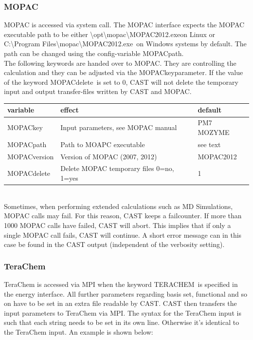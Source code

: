 \documentclass[10pt,a4paper]{article} %
\newif\ifverbose %
\begin{document}
		\subsubsection{MOPAC}
		\ac{MOPAC} is accessed via system call. The \ac{MOPAC} interface expects the \ac{MOPAC} executable path to be either \glqq \textbackslash opt\textbackslash mopac\textbackslash MOPAC2012.exe\grqq on Linux \ifverbose (yes, the executable default fileending is .exe even on Linux-Systems) \fi or \glqq C:\textbackslash Program Files\textbackslash mopac\textbackslash MOPAC2012.exe\grqq~on Windows systems by default. The path can be changed using the config-variable \glqq MOPACpath\grqq.~\\
		The following keywords are handed over to \ac{MOPAC}. They are controlling the calculation and they can be adjusted via the \glqq MOPACkey\grqq parameter.
		If the value of the keyword \glqq MOPACdelete\grqq \ is set to 0, \ac{CAST} will not delete the temporary input and output transfer-files written by \ac{CAST} and \ac{MOPAC}.

		\begin{tabularx}{\textwidth}{l|l|l}
			variable & effect & default \\
			\hline
			MOPACkey & Input parameters, see MOPAC manual & PM7 MOZYME\\
			MOPACpath & Path to MOAPC executable & see text\\
			MOPACversion & Version of MOPAC (2007, 2012) & MOPAC2012\\
			MOPACdelete & Delete MOPAC temporary files 0=no, 1=yes & 1\\

		\end{tabularx}~\\
		
		Sometimes, when performing extended calculations such as \ac{MD} Simulations, \ac{MOPAC} calls may fail. For this reason, \ac{CAST} keeps a failcounter. If more than 1000 \ac{MOPAC} calls have failed, \ac{CAST} will abort. This implies that if only a single \ac{MOPAC} call fails, \ac{CAST} will continue. A short error message can in this case be found in the \ac{CAST} output (independent of the verbosity setting).
		
		\subsubsection{TeraChem}
		TeraChem\supercite{terachem} is accessed via \ac{MPI}\supercite{mpi} when the keyword \glqq TERACHEM\grqq~is specified in the energy interface. All further parameters regarding basis set, functional and so on have to be set in an extra file readable by \ac{CAST}. \ac{CAST} then transfers the input parameters to TeraChem via \ac{MPI}. The syntax for the TeraChem input is such that each string needs to be set in its own line. Otherwise it's identical to the TeraChem input. An example is shown below:
\end{document}
